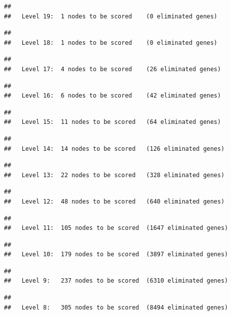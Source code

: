 \documentclass[
]{article}
\begin{document}
\begin{verbatim}
## 
##   Level 19:  1 nodes to be scored    (0 eliminated genes)
\end{verbatim}

\begin{verbatim}
## 
##   Level 18:  1 nodes to be scored    (0 eliminated genes)
\end{verbatim}

\begin{verbatim}
## 
##   Level 17:  4 nodes to be scored    (26 eliminated genes)
\end{verbatim}

\begin{verbatim}
## 
##   Level 16:  6 nodes to be scored    (42 eliminated genes)
\end{verbatim}

\begin{verbatim}
## 
##   Level 15:  11 nodes to be scored   (64 eliminated genes)
\end{verbatim}

\begin{verbatim}
## 
##   Level 14:  14 nodes to be scored   (126 eliminated genes)
\end{verbatim}

\begin{verbatim}
## 
##   Level 13:  22 nodes to be scored   (328 eliminated genes)
\end{verbatim}

\begin{verbatim}
## 
##   Level 12:  48 nodes to be scored   (640 eliminated genes)
\end{verbatim}

\begin{verbatim}
## 
##   Level 11:  105 nodes to be scored  (1647 eliminated genes)
\end{verbatim}

\begin{verbatim}
## 
##   Level 10:  179 nodes to be scored  (3897 eliminated genes)
\end{verbatim}

\begin{verbatim}
## 
##   Level 9:   237 nodes to be scored  (6310 eliminated genes)
\end{verbatim}

\begin{verbatim}
## 
##   Level 8:   305 nodes to be scored  (8494 eliminated genes)
\end{verbatim}
\end{document}

